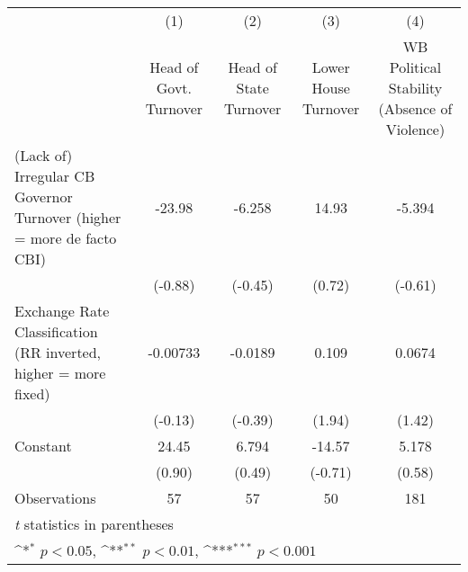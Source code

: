 {
\def\sym#1{\ifmmode^{#1}\else\(^{#1}\)\fi}
\begin{tabular*}{\linewidth}{@{\hskip\tabcolsep\extracolsep\fill}l*{4}{c}}
\toprule
                &\multicolumn{1}{c}{(1)}&\multicolumn{1}{c}{(2)}&\multicolumn{1}{c}{(3)}&\multicolumn{1}{c}{(4)}\\
                &\multicolumn{1}{c}{Head of Govt. Turnover}&\multicolumn{1}{c}{Head of State Turnover}&\multicolumn{1}{c}{Lower House Turnover}&\multicolumn{1}{c}{WB Political Stability (Absence of Violence)}\\
\midrule
(Lack of) Irregular CB Governor Turnover (higher = more de facto CBI)&   -23.98         &   -6.258         &    14.93         &   -5.394         \\
                &  (-0.88)         &  (-0.45)         &   (0.72)         &  (-0.61)         \\
\addlinespace
Exchange Rate Classification (RR inverted, higher = more fixed)& -0.00733         &  -0.0189         &    0.109         &   0.0674         \\
                &  (-0.13)         &  (-0.39)         &   (1.94)         &   (1.42)         \\
\addlinespace
Constant        &    24.45         &    6.794         &   -14.57         &    5.178         \\
                &   (0.90)         &   (0.49)         &  (-0.71)         &   (0.58)         \\
\midrule
Observations    &       57         &       57         &       50         &      181         \\
\bottomrule
\multicolumn{5}{l}{\footnotesize \textit{t} statistics in parentheses}\\
\multicolumn{5}{l}{\footnotesize \sym{*} \(p<0.05\), \sym{**} \(p<0.01\), \sym{***} \(p<0.001\)}\\
\end{tabular*}
}
